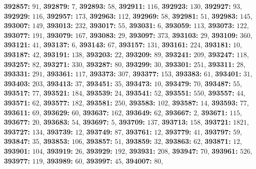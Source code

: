 \textsf{\bfseries 392857:} $91$, \textsf{\bfseries 392879:} $7$, \textsf{\bfseries 392893:} $58$, \textsf{\bfseries 392911:} $116$, \textsf{\bfseries 392923:} $130$, \textsf{\bfseries 392927:} $93$, \textsf{\bfseries 392929:} $116$, \textsf{\bfseries 392957:} $173$, \textsf{\bfseries 392963:} $112$, \textsf{\bfseries 392969:} $58$, \textsf{\bfseries 392981:} $51$, \textsf{\bfseries 392983:} $145$, \textsf{\bfseries 393007:} $149$, \textsf{\bfseries 393013:} $232$, \textsf{\bfseries 393017:} $55$, \textsf{\bfseries 393031:} $6$, \textsf{\bfseries 393059:} $113$, \textsf{\bfseries 393073:} $122$, \textsf{\bfseries 393077:} $191$, \textsf{\bfseries 393079:} $167$, \textsf{\bfseries 393083:} $29$, \textsf{\bfseries 393097:} $373$, \textsf{\bfseries 393103:} $29$, \textsf{\bfseries 393109:} $360$, \textsf{\bfseries 393121:} $41$, \textsf{\bfseries 393137:} $6$, \textsf{\bfseries 393143:} $67$, \textsf{\bfseries 393157:} $131$, \textsf{\bfseries 393161:} $224$, \textsf{\bfseries 393181:} $10$, \textsf{\bfseries 393187:} $42$, \textsf{\bfseries 393191:} $138$, \textsf{\bfseries 393203:} $22$, \textsf{\bfseries 393209:} $89$, \textsf{\bfseries 393241:} $209$, \textsf{\bfseries 393247:} $118$, \textsf{\bfseries 393257:} $82$, \textsf{\bfseries 393271:} $330$, \textsf{\bfseries 393287:} $80$, \textsf{\bfseries 393299:} $30$, \textsf{\bfseries 393301:} $251$, \textsf{\bfseries 393311:} $28$, \textsf{\bfseries 393331:} $291$, \textsf{\bfseries 393361:} $117$, \textsf{\bfseries 393373:} $307$, \textsf{\bfseries 393377:} $153$, \textsf{\bfseries 393383:} $61$, \textsf{\bfseries 393401:} $31$, \textsf{\bfseries 393403:} $203$, \textsf{\bfseries 393413:} $37$, \textsf{\bfseries 393451:} $35$, \textsf{\bfseries 393473:} $10$, \textsf{\bfseries 393479:} $70$, \textsf{\bfseries 393487:} $55$, \textsf{\bfseries 393517:} $77$, \textsf{\bfseries 393521:} $184$, \textsf{\bfseries 393539:} $24$, \textsf{\bfseries 393541:} $52$, \textsf{\bfseries 393551:} $550$, \textsf{\bfseries 393557:} $44$, \textsf{\bfseries 393571:} $62$, \textsf{\bfseries 393577:} $182$, \textsf{\bfseries 393581:} $250$, \textsf{\bfseries 393583:} $102$, \textsf{\bfseries 393587:} $14$, \textsf{\bfseries 393593:} $77$, \textsf{\bfseries 393611:} $69$, \textsf{\bfseries 393629:} $60$, \textsf{\bfseries 393637:} $162$, \textsf{\bfseries 393649:} $62$, \textsf{\bfseries 393667:} $2$, \textsf{\bfseries 393671:} $115$, \textsf{\bfseries 393677:} $20$, \textsf{\bfseries 393683:} $54$, \textsf{\bfseries 393697:} $5$, \textsf{\bfseries 393709:} $137$, \textsf{\bfseries 393713:} $158$, \textsf{\bfseries 393721:} $1821$, \textsf{\bfseries 393727:} $134$, \textsf{\bfseries 393739:} $12$, \textsf{\bfseries 393749:} $87$, \textsf{\bfseries 393761:} $12$, \textsf{\bfseries 393779:} $41$, \textsf{\bfseries 393797:} $59$, \textsf{\bfseries 393847:} $35$, \textsf{\bfseries 393853:} $106$, \textsf{\bfseries 393857:} $51$, \textsf{\bfseries 393859:} $32$, \textsf{\bfseries 393863:} $62$, \textsf{\bfseries 393871:} $12$, \textsf{\bfseries 393901:} $104$, \textsf{\bfseries 393919:} $26$, \textsf{\bfseries 393929:} $192$, \textsf{\bfseries 393931:} $208$, \textsf{\bfseries 393947:} $70$, \textsf{\bfseries 393961:} $526$, \textsf{\bfseries 393977:} $119$, \textsf{\bfseries 393989:} $60$, \textsf{\bfseries 393997:} $45$, \textsf{\bfseries 394007:} $80$, 
